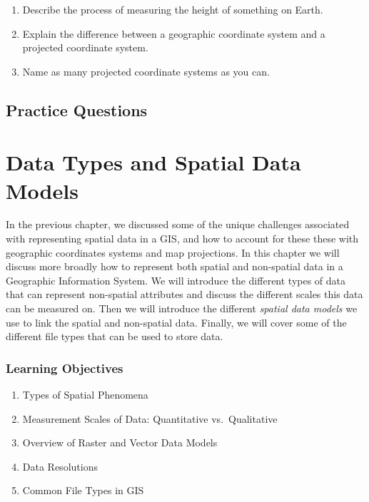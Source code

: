 \documentclass[
]{book}
\providecommand{\tightlist}{%
  \setlength{\itemsep}{0pt}\setlength{\parskip}{0pt}}
\begin{document}
\begin{enumerate}
\def\labelenumi{\arabic{enumi}.}
\tightlist
\item
  Describe the process of measuring the height of something on Earth.
\item
  Explain the difference between a geographic coordinate system and a projected coordinate system.
\item
  Name as many projected coordinate systems as you can.
\end{enumerate}

\hypertarget{practice-questions}{%
\section*{Practice Questions}\label{practice-questions}}

\hypertarget{types-of-data}{%
\chapter{Data Types and Spatial Data Models}\label{types-of-data}}

In the previous chapter, we discussed some of the unique challenges associated with representing spatial data in a GIS, and how to account for these these with geographic coordinates systems and map projections. In this chapter we will discuss more broadly how to represent both spatial and non-spatial data in a Geographic Information System. We will introduce the different types of data that can represent non-spatial attributes and discuss the different scales this data can be measured on. Then we will introduce the different \emph{spatial data models} we use to link the spatial and non-spatial data. Finally, we will cover some of the different file types that can be used to store data.

\hypertarget{learning-objectives-2}{%
\subsection*{Learning Objectives}\label{learning-objectives-2}}

\begin{enumerate}
\def\labelenumi{\arabic{enumi}.}
\tightlist
\item
  Types of Spatial Phenomena
\item
  Measurement Scales of Data: Quantitative vs.~Qualitative
\item
  Overview of Raster and Vector Data Models
\item
  Data Resolutions
\item
  Common File Types in GIS
\end{enumerate}
\end{document}
